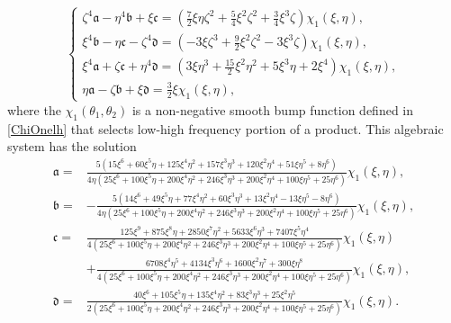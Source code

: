\documentclass[10pt]{amsart}
\theoremstyle{remark}
\theoremstyle{definition}
\numberwithin{equation}{section}
\newcommand{\f}{\frac}
\begin{document}
\begin{equation*}
\begin{cases}
\zeta^4\mathfrak{a}-\eta^4\mathfrak{b}+\xi\mathfrak{c}=\left(\frac{7}{2}\xi\eta\zeta^2+\f54\xi^2\zeta^2+\f34\xi^3\zeta\right)\chi_{1}(\xi,\eta),\\
\xi^4\mathfrak{b}-\eta\mathfrak{c}-\zeta^4\mathfrak{d}=(-3\xi\zeta^3+\f92\xi^2\zeta^2-3\xi^3\zeta)\chi_{1}(\xi,\eta),\\
\xi^4\mathfrak{a}+\zeta\mathfrak{c}+\eta^4\mathfrak{d}=(3\xi\eta^3+\frac{15}{2}\xi^2\eta^2+5\xi^3\eta+2\xi^4)\chi_{1}(\xi,\eta),\\
\eta \mathfrak{a}-\zeta\mathfrak{b}+\xi\mathfrak{d}=\f32\xi\chi_{1}(\xi,\eta),
\end{cases}
\end{equation*}
where the $\chi_1(\theta_1, \theta_2)$ is a non-negative smooth bump function defined in \eqref{ChiOnelh} that selects low-high frequency portion of a product. 
This algebraic system has the solution
\begin{align*}
\mathfrak{a}=&\f{5(15\xi^6+60\xi^5\eta+125\xi^4\eta^2+157\xi^3\eta^3+120\xi^2\eta^4+51\xi\eta^5+8\eta^6)}{4\eta(25\xi^6+100\xi^5\eta+200\xi^4\eta^2+246\xi^3\eta^3+200\xi^2\eta^4+100\xi\eta^5+25\eta^6)}\chi_{1}(\xi,\eta),\\
\mathfrak{b}=&-\f{5(14\xi^6+49\xi^5\eta+77\xi^4\eta^2+60\xi^3\eta^3+13\xi^2\eta^4-13\xi\eta^5-8\eta^6)}
{4\eta(25\xi^6+100\xi^5\eta+200\xi^4\eta^2+246\xi^3\eta^3+200\xi^2\eta^4+100\xi\eta^5+25\eta^6)}\chi_{1}(\xi,\eta),\\
\mathfrak{c}=&\f{125\xi^9+875\xi^8\eta+2850\xi^7\eta^2+5633\xi^6\eta^3+7407\xi^5\eta^4}
{4(25\xi^6+100\xi^5\eta+200\xi^4\eta^2+246\xi^3\eta^3+200\xi^2\eta^4+100\xi\eta^5+25\eta^6)}\chi_{1}(\xi,\eta)\\
&+\f{6708\xi^4\eta^5+4134\xi^3\eta^6+1600\xi^2\eta^7+300\xi\eta^8}
{4(25\xi^6+100\xi^5\eta+200\xi^4\eta^2+246\xi^3\eta^3+200\xi^2\eta^4+100\xi\eta^5+25\eta^6)}\chi_{1}(\xi,\eta),\\
\mathfrak{d}=&\f{40\xi^6+105\xi^5\eta+135\xi^4\eta^2+83\xi^3\eta^3+25\xi^2\eta^5}
{2(25\xi^6+100\xi^5\eta+200\xi^4\eta^2+246\xi^3\eta^3+200\xi^2\eta^4+100\xi\eta^5+25\eta^6)}\chi_{1}(\xi,\eta).
\end{align*}
\end{document}
